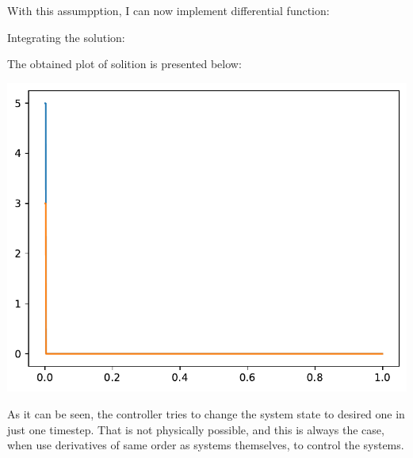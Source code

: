 \documentclass[a4paper,12pt]{article}
\begin{document}
    With this assumpption, I can now implement differential function:
    
    Integrating the solution:
    
    The obtained plot of solition is presented below:
    \begin{center}
        \includegraphics[width=\linewidth]{2d.pdf}
    \end{center}
    As it can be seen, the controller tries to change the system state to desired 
    one in just one timestep. That is not physically possible, and this is always
    the case, when use derivatives of same order as systems themselves, to control
    the systems.
\end{document}
